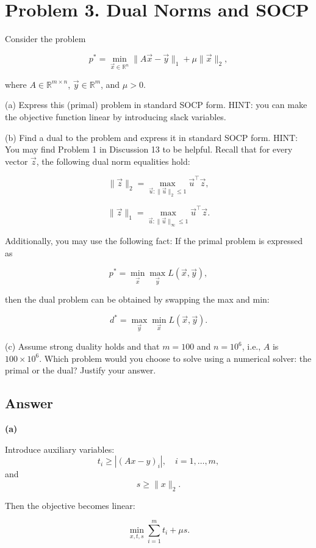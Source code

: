 \documentclass[
	12pt,
]{fphw}
\begin{document}
\newpage
\section*{Problem 3. Dual Norms and SOCP}

Consider the problem

\[
p^* = \min_{\vec{x} \in \mathbb{R}^n} \|A\vec{x} - \vec{y}\|_1 + \mu \|\vec{x}\|_2,
\]

where \(A \in \mathbb{R}^{m \times n}\), \(\vec{y} \in \mathbb{R}^m\), and \(\mu > 0\).

(a) Express this (primal) problem in standard SOCP form. HINT: you can make the objective function linear by introducing slack variables.

(b) Find a dual to the problem and express it in standard SOCP form. HINT: You may find Problem 1 in Discussion 13 to be helpful. Recall that for every vector \(\vec{z}\), the following dual norm equalities hold:

\[
\|\vec{z}\|_2 = \max_{\vec{u} : \|\vec{u}\|_2 \le 1} \vec{u}^\top \vec{z},
\]

\[
\|\vec{z}\|_1 = \max_{\vec{u} : \|\vec{u}\|_\infty \le 1} \vec{u}^\top \vec{z}.
\]

Additionally, you may use the following fact: If the primal problem is expressed as

\[
p^* = \min_{\vec{x}} \max_{\vec{y}} L(\vec{x}, \vec{y}),
\]

then the dual problem can be obtained by swapping the max and min:

\[
d^* = \max_{\vec{y}} \min_{\vec{x}} L(\vec{x}, \vec{y}).
\]

(c) Assume strong duality holds and that \(m = 100\) and \(n = 10^6\), i.e., \(A\) is \(100 \times 10^6\). Which problem would you choose to solve using a numerical solver: the primal or the dual? Justify your answer.

\subsection*{Answer}

\textbf{(a)}

Introduce auxiliary variables:
\[
t_i \ge |(Ax-y)_i|, \quad i=1,\dots,m,
\]
and
\[
s \ge \|x\|_2 .
\]

Then the objective becomes linear:

\[
\min_{x,t,s} \sum_{i=1}^m t_i + \mu s.
\]
\end{document}
